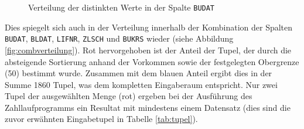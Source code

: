 \begin{figure}[h!]
\centering
	\caption{Verteilung der distinkten Werte in der Spalte \texttt{BUDAT}}
	\label{fig:budatverteilung}
\end{figure}

Dies spiegelt sich auch in der Verteilung innerhalb der Kombination der Spalten \texttt{BUDAT}, \texttt{BLDAT}, \texttt{LIFNR}, \texttt{ZLSCH} und \texttt{BUKRS} wieder (siehe Abbildung \ref{fig:combverteilung}).
Rot hervorgehoben ist der Anteil der Tupel, der durch die absteigende Sortierung anhand der Vorkommen sowie der festgelegten Obergrenze (50) bestimmt wurde.
Zusammen mit dem blauen Anteil ergibt dies in der Summe 1860 Tupel, was dem kompletten Eingaberaum entspricht.
Nur zwei Tupel der ausgewählten Menge (rot) ergeben bei der Ausführung des Zahllaufprogramms ein Resultat mit mindestens einem Datensatz (dies sind die zuvor erwähnten Eingabetupel in Tabelle \ref{tab:tupel}).

